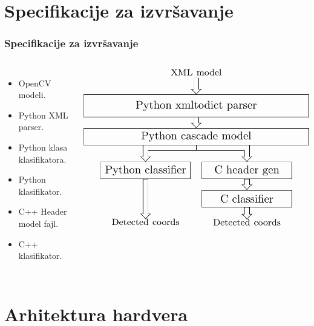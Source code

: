 \documentclass{beamer}
\begin{document}
\section{Specifikacije za izvršavanje}
\begin{frame}
  \frametitle{Specifikacije za izvršavanje}
  \begin{columns}[onlytextwidth,T]
    \column{\dimexpr\linewidth-55mm-2mm}
    \begin{itemize}
    \item<1-> OpenCV modeli.
    \item<1-> Python XML parser.
    \item<1-> Python klasa klasifikatora.
    \item<1-> Python klasifikator.
    \item<1-> C++ Header model fajl.
    \item<1-> C++ klasifikator.
    \end{itemize}

    \column{80mm}
    \begin{overprint}
      \includegraphics[width=0.77\linewidth]{../images/bdp/sw_arch/sw_arch1}
    \end{overprint}

  \end{columns}

\end{frame}


\section{Arhitektura hardvera}
\end{document}
